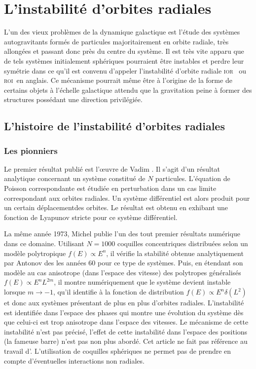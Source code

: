 \section{L'instabilité d'orbites radiales}

L'un des vieux problèmes de la dynamique galactique est l'étude des systèmes autogravitants formés de particules majoritairement en orbite radiale,
très allongées et passant donc près du centre du système. Il est très vite apparu que de tels systèmes initialement sphériques pourraient être
instables et perdre leur symétrie dans ce qu'il est convenu d'appeler l'instabilité d'orbite radiale \textsc{ior} \ ou \textsc{roi}\ en anglais. Ce
mécanisme pourrait même être à l'origine de la forme de certains objets à l'échelle galactique attendu que la gravitation peine à former des
structures possédant une direction privilégiée.


\subsection{L'histoire de l'instabilité d'orbites radiales}

\subsubsection{Les pionniers}

Le premier résultat publié est l'œuvre de Vadim \cite{antonov}. Il s'agit d'un résultat analytique concernant un système constitué de $N$ particules.
L'équation de Poisson correspondante est étudiée en perturbation dans un cas limite correspondant aux orbites radiales. Un système différentiel est
alors produit pour un certain \og déplacement\fg des orbites. Le résultat est obtenu en exhibant une fonction de Lyapunov stricte pour ce système
différentiel.

La même année 1973, Michel \cite{henon} publie l'un des tout premier résultats numérique dans ce domaine. Utilisant $N=1000$ coquilles concentriques
distribuées selon un modèle polytropique $f\left(  E\right)  \propto E^{n}$, il vérifie la stabilité obtenue analytiquement par Antonov des les années
60 pour ce type de systèmes. Puis, en étendant son modèle au cas anisotrope (dans l'espace des vitesse) des polytropes généralisés  $f\left(  E\right)
\propto E^{n}L^{2m}$, il montre numériquement que le système devient instable lorsque $m\rightarrow-1$, qu'il identifie à la fonction de distribution
$f\left(  E\right)  \propto E^{n}\delta\left(  L^{2}\right) $ et donc aux systèmes présentant de plus en plus d'orbites radiales. L'instabilité est
identifiée dans l'espace des phases qui montre une évolution du système dès que celui-ci est trop anisotrope dans l'espace des vitesses. Le mécanisme
de cette instabilité n'est pas précisé, l'effet de cette instabilité dans l'espace des positions (la fameuse barre) n'est pas non plus abordé. Cet
article ne fait pas référence au travail d'\cite{antonov}. L'utilisation de coquilles sphériques ne permet pas de prendre en compte d'éventuelles
interactions non radiales.

